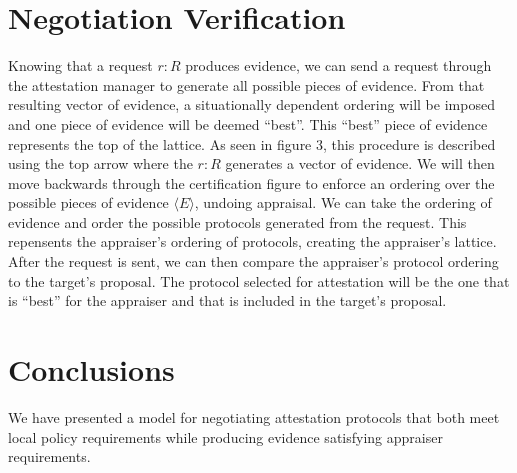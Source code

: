 \documentclass[sigconf,authordraft]{acmart}
\begin{document}

\section{Negotiation Verification}

Knowing that a request $r:R$ produces evidence, we can send a request through the attestation manager to generate all possible pieces of evidence. From that resulting vector of evidence, a situationally dependent ordering will be imposed and one piece of evidence will be deemed ``best''. This ``best'' piece of evidence represents the top of the lattice. As seen in figure 3, this procedure is described using the top arrow where the $r:R$ generates a vector of evidence. We will then move backwards through the certification figure to enforce an ordering over the possible pieces of evidence $\langle E \rangle$, undoing appraisal. We can take the ordering of evidence and order the possible protocols generated from the request. This repensents the appraiser's ordering of protocols, creating the appraiser's lattice. After the request is sent, we can then compare the appraiser's protocol ordering to the target's proposal. The protocol selected for attestation will be the one that is ``best'' for the appraiser and that is included in the target's proposal.      

\section{Conclusions}

We have presented a model for negotiating attestation protocols that
both meet local policy requirements while producing evidence
satisfying appraiser requirements.

\nocite{Coker::Principles-of-R,Ramsdell:2019aa,Petz:2019aa}



\end{document}
